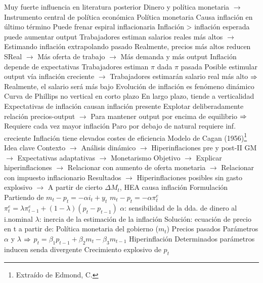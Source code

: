 \documentclass{nuevotema}
\begin{document}
\begin{esquemal}
				\4 Muy fuerte influencia en literatura posterior
				\4[] Dinero y política monetaria
				\4[] $\to$ Instrumento central de política económica
				\4 Política monetaria
				\4[] Causa inflación en último término
				\4[] Puede frenar espiral inflacionaria
				\4 Inflación > inflación esperada puede aumentar output
				\4[] Trabajadores estiman salarios reales más altos
				\4[] $\to$ Estimando inflación extrapolando pasado
				\4[] Realmente, precios más altos reducen SReal
				\4[] $\to$ Más oferta de trabajo
				\4[] $\to$ Más demanda y más output
				\4 Inflación depende de expectativas
				\4[] Trabajadores estiman $\pi$ dada $\pi$ pasada
				\4[] Posible estimular output vía inflación creciente
				\4[] $\to$ Trabajadores estimarán salario real más alto
				\4[] $\then$ Realmente, el salario será más bajo
				\4 Evolución de inflación es fenómeno dinámico
				\4[] Curva de Phillips no vertical en corto plazo
				\4[] En largo plazo, tiende a verticalidad
				\4[] Expectativas de inflación causan inflación presente
				\4[] Explotar deliberadamente relación precios-output
				\4[] $\to$ Para mantener output por encima de equilibrio
				\4[] $\then$ Requiere cada vez mayor inflación
				\4[$\then$] Paro por debajo de natural requiere inf. creciente
				\4[$\then$] Inflación tiene elevados costes de eficiencia
			\3 Modelo de Cagan (1956)\footnote{Extraído de Edmond, C.}
				\4 Idea clave
				\4[] Contexto
				\4[] $\to$ Análisis dinámico
				\4[] $\to$ Hiperinflaciones pre y post-II GM
				\4[] $\to$ Expectativas adaptativas
				\4[] $\to$ Monetarismo
				\4[] Objetivo
				\4[] $\to$ Explicar hiperinflaciones
				\4[] $\to$ Relacionar con aumento de oferta monetaria
				\4[] $\to$ Relacionar con impuesto inflacionario
				\4[] Resultados
				\4[] $\to$ Hiperinflaciones posibles sin gasto explosivo
				\4[] $\to$ A partir de cierto $\Delta M_t$, HEA causa inflación
				\4 Formulación
				\4[] Partiendo de $m_t - p_t = -\alpha i_t + y_t$
				\4[(1)] $m_t - p_t = -\alpha \pi^e_t$
				\4[(2)] $\pi_t^e = \lambda \pi_{t-1}^e + (1-\lambda) (p_t - p_{t-1})$
				\4[$\to$] $\alpha$: sensibilidad de la dda. de dinero al i.nominal
				\4[$\to$] $\lambda$: inercia de la estimación de la inflación
				\4 Solución: ecuación de precio en t a partir de:
				\4[(i)] Política monetaria del gobierno ($m_t$)
				\4[(ii)] Precios pasados
				\4[(iii)] Parámetros $\alpha$ y $\lambda$
				\4[] $\then$ $p_t = \beta_1 p_{t-1} + \beta_2 m_t - \beta_3 m_{t-1}$
				\4 Hiperinflación
				\4[] Determinados parámetros inducen senda divergente
				\4[] Crecimiento explosivo de $p_t$

\end{esquemal}
\end{document}
